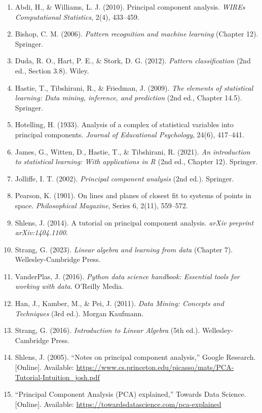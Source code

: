 \documentclass[12pt, a4paper]{report}
\begin{document}
\begin{enumerate}
    \item Abdi, H., \& Williams, L. J. (2010). Principal component analysis. \textit{WIREs Computational Statistics}, 2(4), 433–459. 
    \item Bishop, C. M. (2006). \textit{Pattern recognition and machine learning} (Chapter 12). Springer.
    \item Duda, R. O., Hart, P. E., \& Stork, D. G. (2012). \textit{Pattern classification} (2nd ed., Section 3.8). Wiley.
    \item Hastie, T., Tibshirani, R., \& Friedman, J. (2009). \textit{The elements of statistical learning: Data mining, inference, and prediction} (2nd ed., Chapter 14.5). Springer.
    \item Hotelling, H. (1933). Analysis of a complex of statistical variables into principal components. \textit{Journal of Educational Psychology}, 24(6), 417–441.
    \item James, G., Witten, D., Hastie, T., \& Tibshirani, R. (2021). \textit{An introduction to statistical learning: With applications in R} (2nd ed., Chapter 12). Springer.
    \item Jolliffe, I. T. (2002). \textit{Principal component analysis} (2nd ed.). Springer.
    \item Pearson, K. (1901). On lines and planes of closest fit to systems of points in space. \textit{Philosophical Magazine}, Series 6, 2(11), 559–572.
    \item Shlens, J. (2014). A tutorial on principal component analysis. \textit{arXiv preprint arXiv:1404.1100}.
    \item Strang, G. (2023). \textit{Linear algebra and learning from data} (Chapter 7). Wellesley-Cambridge Press.
    \item VanderPlas, J. (2016). \textit{Python data science handbook: Essential tools for working with data}. O’Reilly Media.
    \item Han, J., Kamber, M., \& Pei, J. (2011). \textit{Data Mining: Concepts and Techniques} (3rd ed.). Morgan Kaufmann.
    \item Strang, G. (2016). \textit{Introduction to Linear Algebra} (5th ed.). Wellesley-Cambridge Press.
    \item Shlens, J. (2005). ``Notes on principal component analysis,'' Google Research. [Online]. Available: \url{https://www.cs.princeton.edu/picasso/mats/PCA-Tutorial-Intuition_josh.pdf}
    \item ``Principal Component Analysis (PCA) explained,'' Towards Data Science. [Online]. Available: \url{https://towardsdatascience.com/pca-explained}
    

\end{enumerate}
\end{document}
